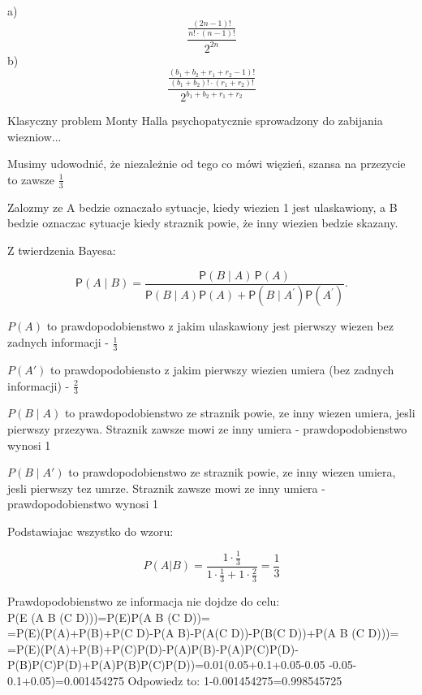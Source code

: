 \documentclass[fleqn]{article}
\begin{document}
a)
\[\frac{\frac{(2n-1)!}{n!\cdot(n-1)!}}{2^{2n}}\]
b)
\[\frac{\frac{(b_{1}+b_{2}+r_{1}+r_{2}-1)!}{(b_{1}+b_{2})!\cdot(r_{1}+r_{2})!}}{2^{b_{1}+b_{2}+r_{1}+r_{2}}} \]
\newpage
\medskip
{}
\medskip

Klasyczny problem Monty Halla psychopatycznie sprowadzony do zabijania wiezniow...

Musimy udowodnić, że niezależnie od tego co mówi więzień, szansa na przezycie to zawsze $\frac{1}{3}$

Zalozmy ze A bedzie oznaczało sytuacje, kiedy wiezien 1 jest ulaskawiony, a B bedzie oznaczac sytuacje kiedy straznik powie, że inny wiezien bedzie skazany.


Z twierdzenia Bayesa:

\[{\displaystyle {\mathsf {P}}(A\mid B)={\frac {{\mathsf {P}}(B\mid A)\,{\mathsf {P}}(A)}{{\mathsf {P}}(B\mid A){\mathsf {P}}(A)+{\mathsf {P}}(B\mid A^{\prime }){\mathsf {P}}(A^{\prime })}}}.	\]



$P(A)$ to prawdopodobienstwo z jakim ulaskawiony jest pierwszy wiezen bez zadnych informacji - $\frac{1}{3}$

$P(A')$ to prawdopodobiensto z jakim pierwszy wiezien umiera (bez zadnych informacji) - $\frac{2}{3}$

$P(B \mid A)$ to prawdopodobienstwo ze straznik powie, ze inny wiezen umiera, jesli pierwszy przezywa. Straznik zawsze mowi ze inny umiera - prawdopodobienstwo wynosi 1

$P(B \mid A')$ to prawdopodobienstwo ze straznik powie, ze inny wiezen umiera, jesli pierwszy tez umrze. Straznik zawsze mowi ze inny umiera - prawdopodobienstwo wynosi 1

Podstawiajac wszystko do wzoru:

\[P(A | B) = \frac{1 \cdot \frac{1}{3}}{1 \cdot \frac{1}{3} + 1 \cdot \frac{2}{3}} = \frac{1}{3}  \]
 
\medskip
{}
\medskip
Prawdopodobienstwo ze informacja nie dojdze do celu:\\
P(E \cap (A \cup B \cup (C \cap D)))=P(E)P(A \cup B \cup (C \cap D))=\\=P(E)(P(A)+P(B)+P(C \cap D)-P(A \cap B)-P(A\cap (C \cap D))-P(B\cap (C \cap D))+P(A \cap B \cap (C \cap D)))=\\=P(E)(P(A)+P(B)+P(C)P(D)-P(A)P(B)-P(A)P(C)P(D)-P(B)P(C)P(D)+P(A)P(B)P(C)P(D))=0.01\cdot (0.05+0.1+0.05-0.05 -0.05-0.1+0.05)=0.001454275
Odpowiedz to: 1-0.001454275=0.998545725
\end{document}

